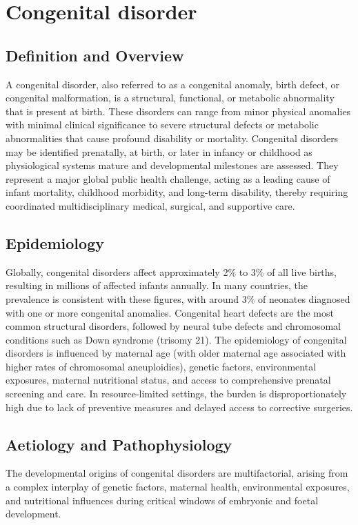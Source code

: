\chapter{Congenital disorder}

\section*{Definition and Overview}
A congenital disorder, also referred to as a congenital anomaly, birth defect, or congenital malformation, is a structural, functional, or metabolic abnormality that is present at birth. These disorders can range from minor physical anomalies with minimal clinical significance to severe structural defects or metabolic abnormalities that cause profound disability or mortality. Congenital disorders may be identified prenatally, at birth, or later in infancy or childhood as physiological systems mature and developmental milestones are assessed. They represent a major global public health challenge, acting as a leading cause of infant mortality, childhood morbidity, and long-term disability, thereby requiring coordinated multidisciplinary medical, surgical, and supportive care.

\section*{Epidemiology}
Globally, congenital disorders affect approximately 2\% to 3\% of all live births, resulting in millions of affected infants annually. In many countries, the prevalence is consistent with these figures, with around 3\% of neonates diagnosed with one or more congenital anomalies. Congenital heart defects are the most common structural disorders, followed by neural tube defects and chromosomal conditions such as Down syndrome (trisomy 21). The epidemiology of congenital disorders is influenced by maternal age (with older maternal age associated with higher rates of chromosomal aneuploidies), genetic factors, environmental exposures, maternal nutritional status, and access to comprehensive prenatal screening and care. In resource-limited settings, the burden is disproportionately high due to lack of preventive measures and delayed access to corrective surgeries.

\section*{Aetiology and Pathophysiology}
The developmental origins of congenital disorders are multifactorial, arising from a complex interplay of genetic factors, maternal health, environmental exposures, and nutritional influences during critical windows of embryonic and foetal development.

